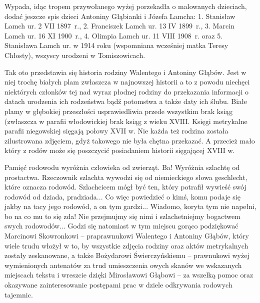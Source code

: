 Wypada, idąc tropem przywołanego wyżej porzekadła o malowanych dzieciach, dodać jeszcze spis dzieci Antoniny Głąbianki i Józefa Lamcha: 1. Stanisław Lamch ur. 2 VII 1897~r., 2. Franciszek Lamch ur. 13 IV 1899~r., 3. Marcin Lamch ur. 16 XI 1900~r., 4. Olimpia Lamch ur. 11 VIII 1908~r. oraz 5. Stanisława Lamch ur. w 1914 roku (wspomniana wcześniej matka Teresy Chłosty), wszyscy urodzeni w Tomiszowicach.

Tak oto przedstawia się historia rodziny Walentego i Antoniny Głąbów. Jest w niej trochę białych plam zwłaszcza w najnowszej historii a to z powodu niechęci niektórych członków tej nad wyraz płodnej rodziny do przekazania informacji o datach urodzenia ich rodzeństwa bądź potomstwa a także daty ich ślubu. Białe plamy w głębokiej przeszłości usprawiedliwia przede wszystkim brak ksiąg (zwłaszcza w parafii włodowickiej brak ksiąg z wieku XVIII. Księgi metrykalne parafii niegowskiej sięgają połowy XVII w.
Nie każda też rodzina została zilustrowana zdjęciem, gdyż takowego nie była chętna przekazać. A przecież mało który z rodów może się poszczycić posiadaniem historii sięgającej XVIII w. 

Pamięć rodowodu wyróżnia człowieka od zwierząt. Ba! Wyróżnia szlachtę od prostactwa. Rzeczownik szlachta wywodzi się od niemieckiego słowa geschlecht, które oznacza rodowód. Szlachcicem mógł być ten, który potrafił wywieść swój rodowód od dziada, pradziada... Co więc powiedzieć o kimś, komu podaje się jakby na tacy jego rodowód, a on tym gardzi... Wiadomo, koryta tym nie napełni, bo na co mu to się zda! Nie przejmujmy się nimi i szlachetniejmy bogactwem swych rodowodów... Godzi się natomiast w tym miejscu gorąco podziękować Marcinowi Skowronkowi -- praprawnukowi Walentego i Antoniny Głąbów, który wiele trudu włożył w to, by wszystkie zdjęcia rodziny oraz aktów metrykalnych zostały zeskanowane, a także Bożydarowi Świerczyńskiemu -- prawnukowi wyżej wymienionych antenatów za trud umieszczenia owych skanów we wskazanych miejscach tekstu i wreszcie dzięki Mirosławowi Głąbowi -- za wszelką pomoc oraz okazywane zainteresowanie postępami prac w dziele odkrywania rodowych tajemnic.

